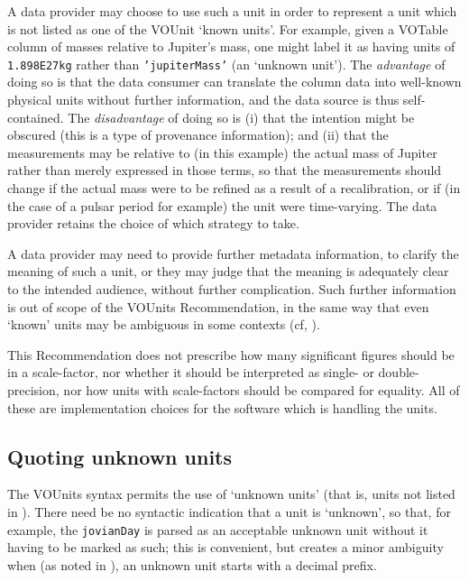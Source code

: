 \documentclass[11pt,a4paper]{ivoa}
\newcommand{\unit}[1]{\texttt{\small\color{orange}#1}}
\begin{document}
A data provider may choose to use such a unit in order to represent a
unit which is not listed as one of the VOUnit `known units'.  For
example, given a VOTable column of masses relative to Jupiter's mass,
one might label it as having units of \unit{1.898E27kg} rather than
\unit{'jupiterMass'} (an `unknown unit').
The \emph{advantage} of doing so is that the data consumer can
translate the column data into well-known physical units without further
information, and the data source is thus self-contained.
The \emph{disadvantage} of doing so is (i) that the intention might be
obscured (this is a type of provenance information);
and (ii) that the measurements may be relative to (in this example)
the actual mass of Jupiter rather than merely expressed in those terms,
so that the measurements should change if the actual mass were to be
refined as a result of a recalibration, or if (in the case of a pulsar
period for example) the unit were time-varying.  The data provider retains the
choice of which strategy to take.

A data provider may need to provide further metadata information, to
clarify the meaning of such a unit, or they may judge that the meaning
is adequately clear to the intended audience, without further
complication.  Such further information is out of scope of the VOUnits
Recommendation, in the same way that even `known' units may be
ambiguous in some contexts (cf, ).

This Recommendation does not prescribe how many significant figures
should be in a scale-factor, nor whether it should be interpreted as
single- or double-precision, nor how units with scale-factors should
be compared for equality.  All of these are implementation choices for
the software which is handling the units.

\subsection{Quoting unknown units\label{sec:quoting}}

The VOUnits syntax permits the use of `unknown units' (that is, units not listed
in ).  There need be no syntactic indication that
a unit is `unknown', so that, for example, the \unit{jovianDay} is
parsed as an acceptable unknown unit without it having to be marked
as such; this is convenient, but creates a minor ambiguity when (as
noted in ), an unknown unit starts
with a decimal prefix.
\end{document}
